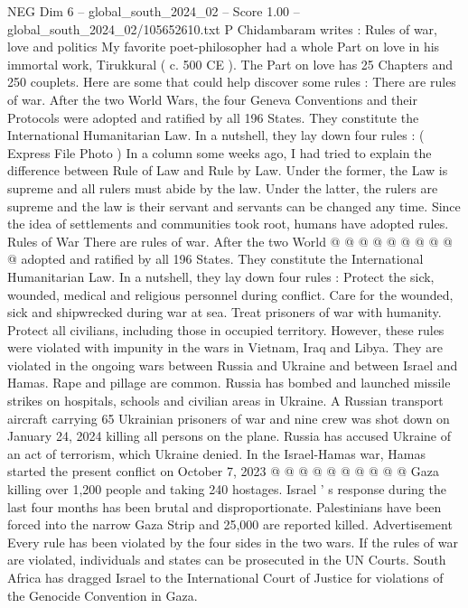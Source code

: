 \begin{textsample}{NEG Dim 6 – global\_south\_2024\_02 – Score 1.00 – global\_south\_2024\_02/105652610.txt}  \label{ex:f6_neg_280}
P Chidambaram writes : Rules of war, love and politics My favorite poet-philosopher had a whole Part on love in his immortal work, Tirukkural ( c. 500 CE ).
The Part on love has 25 Chapters and 250 couplets.
Here are some that could help discover some rules : There are rules of war.
After the two World Wars, the four Geneva Conventions and their Protocols were adopted and ratified by all 196 States.
They constitute the International Humanitarian Law.
In a nutshell, they lay down four rules : ( Express File Photo ) In a column some weeks ago, I had tried to explain the difference between Rule of Law and Rule by Law.
Under the former, the Law is supreme and all rulers must abide by the law.
Under the latter, the rulers are supreme and the law is their servant and servants can be changed any time.
Since the idea of settlements and communities took root, humans have adopted rules.
Rules of War There are rules of war.
After the two World @ @ @ @ @ @ @ @ @ @ adopted and ratified by all 196 States.
They constitute the International Humanitarian Law.
In a nutshell, they lay down four rules : Protect the sick, wounded, medical and religious personnel during conflict.
Care for the wounded, sick and shipwrecked during war at sea.
Treat prisoners of war with humanity.
Protect all civilians, including those in occupied territory.
However, these rules were violated with impunity in the wars in Vietnam, Iraq and Libya.
They are violated in the ongoing wars between Russia and Ukraine and between Israel and Hamas.
Rape and pillage are common.
Russia has bombed and launched missile strikes on hospitals, schools and civilian areas in Ukraine.
A Russian transport aircraft carrying 65 Ukrainian prisoners of war and nine crew was shot down on January 24, 2024 killing all persons on the plane.
Russia has accused Ukraine of an act of terrorism, which Ukraine denied.
In the Israel-Hamas war, Hamas started the present conflict on October 7, 2023 @ @ @ @ @ @ @ @ @ @ Gaza killing over 1,200 people and taking 240 hostages.
Israel ' s response during the last four months has been brutal and disproportionate.
Palestinians have been forced into the narrow Gaza Strip and 25,000 are reported killed.
Advertisement Every rule has been violated by the four sides in the two wars.
If the rules of war are violated, individuals and states can be prosecuted in the UN Courts.
South Africa has dragged Israel to the International Court of Justice for violations of the Genocide Convention in Gaza.

\end{textsample}
